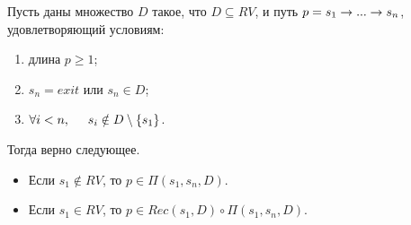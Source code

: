\begin{lemma}
\label{lemma:main}
Пусть даны множество $D$ такое, что $D \subseteq RV$, и путь $p = s_1 \rightarrow ... \rightarrow s_n$, удовлетворяющий условиям:
\begin{enumerate}
    \item длина $p \geq 1$;
    \item $s_n = exit$ или $s_n \in D$;
    \item $\forall i < n, \hspace{5mm} s_i \notin D \setminus \{s_1\}$.
\end{enumerate}
Тогда верно следующее.
\begin{itemize}
    \item Если $s_1 \notin RV$, то $p \in \Pi(s_1,s_n,D)$.  
    \item Если $s_1 \in RV$, то $p \in Rec(s_1,D) \circ \Pi(s_1,s_n,D)$.  
\end{itemize}
\end{lemma}

